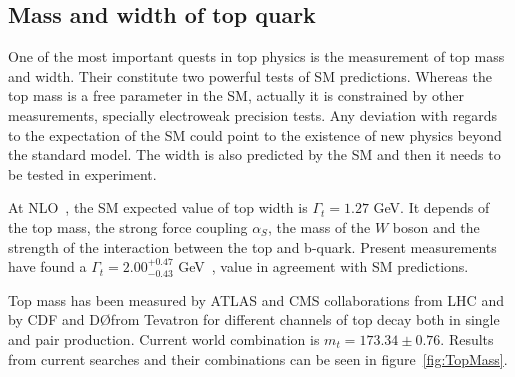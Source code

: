 %
%
%
%
%
%

\subsection{Mass and width of top quark}

One of the most important quests in top physics is the measurement of top mass and width. Their constitute two powerful tests of SM predictions. Whereas the top mass is a free parameter in the SM, actually it is constrained by other measurements, specially electroweak precision tests. Any deviation with regards to the expectation of the SM could point to the existence of new physics beyond the standard model. The width is also predicted by the SM and then it needs to be tested in experiment. 

At NLO~\cite{Jezabek19891}, the SM expected value of top width is $\Gamma_{t}=1.27$ GeV. It depends of the top mass, the strong force coupling $\alpha_{S}$, the mass of the $W$ boson and the strength of the interaction between the top and b-quark. Present measurements have found a $\Gamma_{t}=2.00^{+0.47}_{-0.43}$ GeV~\cite{Abazov:2012vd}, value in agreement with SM predictions. 

Top mass has been measured by ATLAS and CMS collaborations from LHC and by CDF and D\O from Tevatron for different channels of top decay both in single and pair production. Current world combination is $m_{t}=173.34\pm 0.76$. Results from current searches and their combinations can be seen in figure~\ref{fig:TopMass}. 

